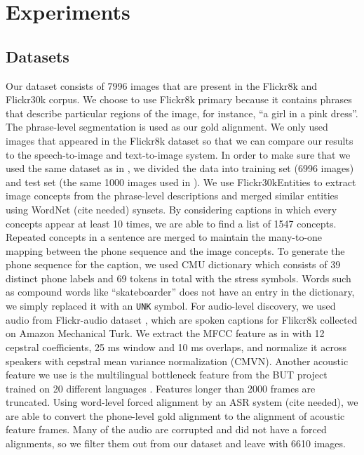 \documentclass[journal]{IEEEtran}
\begin{document}

\section{Experiments}
\subsection{Datasets}
Our dataset consists of 7996 images that are present in the Flickr8k and Flickr30k corpus. We choose to use Flickr8k primary because it contains phrases that describe particular regions of the image, for instance, ``a girl in a pink dress''. The phrase-level segmentation is used as our gold alignment. We only used images that appeared in the Flickr8k dataset so that we can compare our results to the speech-to-image \cite{Harwath15} and text-to-image \cite{Karpathy15} system. In order to make sure that we used the same dataset as in \cite{Karpathy15, Harwath15}, we divided the data into training set (6996 images) and test set (the same 1000 images used in \cite{Karpathy15, Harwath15}).  We use Flickr30kEntities to extract image concepts from the phrase-level descriptions and merged similar entities using WordNet (cite needed) synsets. By considering captions in which every concepts appear at least 10 times, we are able to find a list of 1547 concepts. Repeated concepts in a sentence are merged to maintain the many-to-one mapping between the phone sequence and the image concepts. To generate the phone sequence for the caption, we used CMU dictionary  which consists of 39 distinct phone labels and 69 tokens in total with the stress symbols. Words such as compound words like ``skateboarder'' does not have an entry in the dictionary, we simply replaced it with an \texttt{UNK} symbol. For audio-level discovery, we used audio from Flickr-audio dataset \cite{Harwath15}, which are spoken captions for Flikcr8k collected on Amazon Mechanical Turk. We extract the MFCC feature as in \cite{Rasanen2015, Kamper2016} with 12 cepstral coefficients, 25 ms window and 10 ms overlaps, and normalize it across speakers with cepstral mean variance normalization (CMVN). Another acoustic feature we use is the multilingual bottleneck feature from the BUT project  trained on 20 different languages \cite{Fer2017}. Features longer than 2000 frames are truncated. Using word-level forced alignment by an ASR system (cite needed), we are able to convert the phone-level gold alignment to the alignment of acoustic feature frames. Many of the audio are corrupted and did not have a forced alignments, so we filter them out from our dataset and leave with 6610 images. 
 
\end{document}
